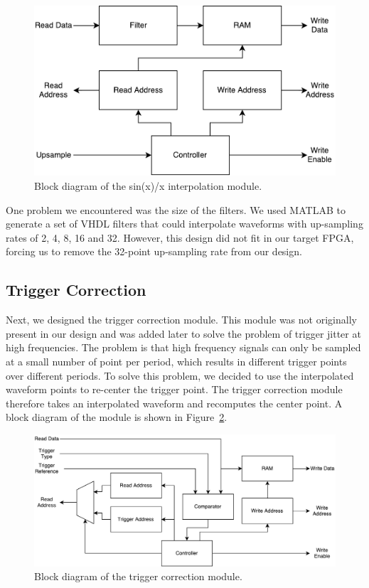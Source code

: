 \documentclass[journal,hidelinks]{IEEEtran}
\begin{document}
\begin{figure}[!htb]
  \centering
  \includegraphics[width=\columnwidth]{diagrams/sinc_interpolation.pdf}
  \caption{Block diagram of the sin(x)/x interpolation module.}
  \label{fig:sinc_interpol}
\end{figure}

One problem we encountered was the size of the filters. We used MATLAB to generate a set of VHDL filters that could interpolate waveforms with up-sampling rates of 2, 4, 8, 16 and 32. However, this design did not fit in our target FPGA, forcing us to remove the 32-point up-sampling rate from our design.

\subsection{Trigger Correction}

Next, we designed the trigger correction module. This module was not originally present in our design and was added later to solve the problem of trigger jitter at high frequencies. The problem is that high frequency signals can only be sampled at a small number of point per period, which results in different trigger points over different periods. To solve this problem, we decided to use the interpolated waveform points to re-center the trigger point. The trigger correction module therefore takes an interpolated waveform and recomputes the center point. A block diagram of the module is shown in Figure~\ref{fig:trig_correction}.

\begin{figure}[!htb]
  \centering
  \includegraphics[width=\columnwidth]{diagrams/trigger_correction.pdf}
  \caption{Block diagram of the trigger correction module.}
  \label{fig:trig_correction}
\end{figure}
\end{document}
